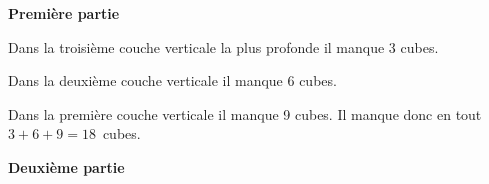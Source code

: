
\bigskip

\textbf{Première partie}

\medskip

%
%
Dans la troisième couche verticale la plus profonde il manque 3 cubes.

Dans la deuxième couche verticale  il manque 6 cubes.

Dans la première couche verticale il manque 9 cubes. Il manque donc en tout $3 + 6 + 9 = 18$~cubes.
\bigskip

\textbf{Deuxième partie}

\medskip

